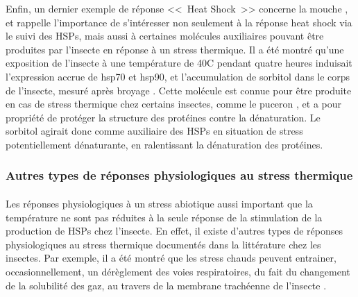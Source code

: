 

		Enfin, un dernier exemple de réponse <<~Heat Shock~>> concerne la mouche , et rappelle l'importance de s'intéresser non seulement à la réponse heat shock via le suivi des HSPs, mais aussi à certaines molécules auxiliaires pouvant être produites par l'insecte en réponse à un stress thermique.
		Il a été montré qu'une exposition de l'insecte à une température de 40\textdegree{}C pendant quatre heures induisait l'expression accrue de hsp70 et hsp90, et l'accumulation de sorbitol dans le corps de l'insecte, mesuré après broyage \cite{salvucci2000}.
		Cette molécule est connue pour être produite en cas de stress thermique chez certains insectes, comme le puceron \cite{hendrix1998}, et a pour propriété de protéger la structure des protéines contre la dénaturation.
		Le sorbitol agirait donc comme auxiliaire des HSPs en situation de stress potentiellement dénaturante, en ralentissant la dénaturation des protéines.

		\subsubsection{Autres types de réponses physiologiques au stress thermique} %

		\paragraph*{}
		Les réponses physiologiques à un stress abiotique aussi important que la température ne sont pas réduites à la seule réponse de la stimulation de la production de HSPs chez l'insecte.
		En effet, il existe d'autres types de réponses physiologiques au stress thermique documentés dans la littérature chez les insectes.
		Par exemple, il a été montré que les stress chauds peuvent entrainer, occasionnellement, un dérèglement des voies respiratoires, du fait du changement de la solubilité des gaz, au travers de la membrane trachéenne de l'insecte \cite{neven2000}.

		\paragraph*{}


